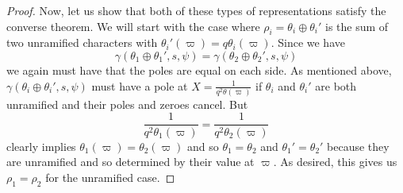 \begin{proof}
  Now, let us show that both of these types of representations satisfy the converse theorem.
  We will start with the case where $\rho_i = \theta_i \oplus \theta_i'$ is the sum of two unramified characters with $\theta_i'(\varpi) = q \theta_i (\varpi)$.
  Since we have
  \[\gamma(\theta_1 \oplus \theta_1', s, \psi) = \gamma(\theta_2 \oplus \theta_2',s,\psi)\]
  we again must have that the poles are equal on each side.
  As mentioned above, $\gamma(\theta_i \oplus \theta_i' ,s, \psi)$ must have a pole at $X = \frac{1}{q^2 \theta(\varpi)}$ if $\theta_i$ and $\theta_i'$ are both unramified and their poles and zeroes cancel.
  But \[\frac{1}{q^2 \theta_1(\varpi)} = \frac{1}{q^2 \theta_2(\varpi)}\]
  clearly implies $\theta_1(\varpi) = \theta_2(\varpi)$ and so $\theta_1 = \theta_2$ and $\theta_1' = \theta_2'$ because they are unramified and so determined by their value at $\varpi$.
  As desired, this gives us $\rho_1 = \rho_2$ for the unramified case.


\end{proof}
